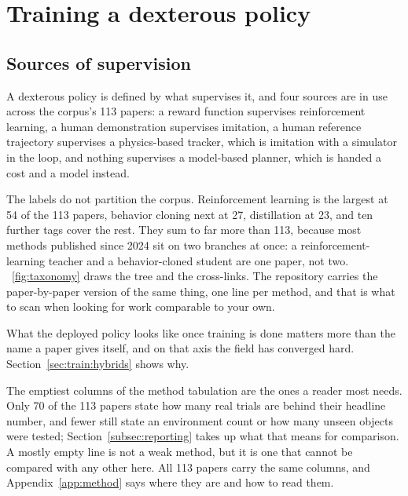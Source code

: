 \section{Training a dexterous policy}
\label{sec:training}

\subsection{Sources of supervision}
\label{sec:train:space}


A dexterous policy is defined by what supervises it, and four sources are in use across the
corpus's 113 papers: a reward function supervises reinforcement learning, a human
demonstration supervises imitation, a human reference trajectory supervises a physics-based
tracker, which is imitation with a simulator in the loop, and nothing supervises a model-based
planner, which is handed a cost and a model instead.

The labels do not partition the corpus. Reinforcement learning is the largest at 54 of the 113
papers, behavior cloning next at 27, distillation at 23, and ten further tags cover the rest.
They sum to far more than 113, because most methods published since 2024 sit on two branches at
once: a reinforcement-learning teacher and a behavior-cloned student are one paper, not two.
\figurename~\ref{fig:taxonomy} draws the tree and the cross-links. The repository carries the
paper-by-paper version of the same thing, one line per method, and that is what to scan when looking
for work comparable to your own.

What the deployed policy looks like once training is done matters more than the name a paper gives
itself, and on that axis the field has converged hard. Section~\ref{sec:train:hybrids} shows why.

\label{sec:train:master}
The emptiest columns of
the method tabulation are the ones a reader most needs. Only 70 of the 113 papers state how many
real trials are behind their headline number, and fewer still state an environment count or how
many unseen objects were tested; Section~\ref{subsec:reporting} takes up what that means for
comparison. A mostly empty line is not a weak method, but it is one that cannot be compared with
any other here. All 113 papers carry the same columns, and Appendix~\ref{app:method} says where
they are and how to read them.

